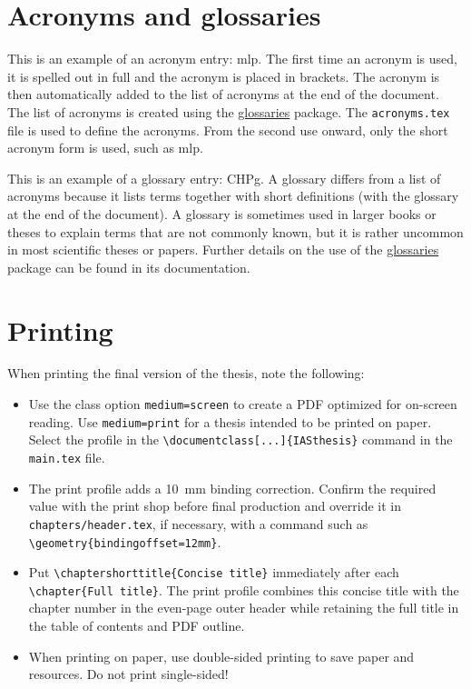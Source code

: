

\section{Acronyms and glossaries}
\label{sec:acronyms}
This is an example of an acronym entry: \gls{mlp}. The first time an acronym is used, it is spelled out in full and the acronym is placed in brackets. The acronym is then automatically added to the list of acronyms at the end of the document. The list of acronyms is created using the \href{https://ctan.org/pkg/glossaries}{glossaries} package. The \texttt{acronyms.tex} file is used to define the acronyms. From the second use onward, only the short acronym form is used, such as \gls{mlp}.

This is an example of a glossary entry: \gls{CHPg}. A glossary differs from a list of acronyms because it lists terms together with short definitions (with the glossary at the end of the document). A glossary is sometimes used in larger books or theses to explain terms that are not commonly known, but it is rather uncommon in most scientific theses or papers. Further details on the use of the \href{https://ctan.org/pkg/glossaries}{glossaries} package can be found in its documentation.

\section{Printing}
When printing the final version of the thesis, note the following:
\begin{itemize}
	\item Use the class option \verb|medium=screen| to create a PDF optimized for on-screen reading. Use \verb|medium=print| for a thesis intended to be printed on paper. Select the profile in the \verb|\documentclass[...]{IASthesis}| command in the \texttt{main.tex} file.
	\item The print profile adds a \SI{10}{\milli\metre} binding correction. Confirm the required value with the print shop before final production and override it in \texttt{chapters/header.tex}, if necessary, with a command such as \verb|\geometry{bindingoffset=12mm}|.
	\item Put \verb|\chaptershorttitle{Concise title}| immediately after each \verb|\chapter{Full title}|. The print profile combines this concise title with the chapter number in the even-page outer header while retaining the full title in the table of contents and PDF outline.
	\item When printing on paper, use double-sided printing to save paper and resources. Do not print single-sided!
\end{itemize}


